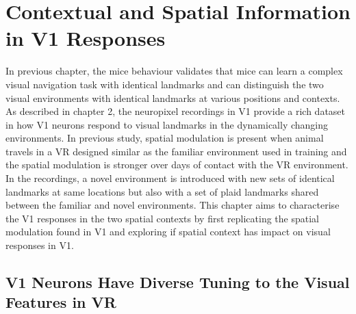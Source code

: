 \chapter{Contextual and Spatial Information in V1 Responses}
\label{chapterlabel4}
In previous chapter, the mice behaviour validates that mice can learn a complex visual navigation task with identical landmarks and can distinguish the two visual environments with identical landmarks at various positions and contexts. As described in chapter 2, the neuropixel recordings in V1 provide a rich dataset in how V1 neurons respond to visual landmarks in the dynamically changing environments. In previous study, spatial modulation is present when animal travels in a VR designed similar as the familiar environment used in training and the spatial modulation is stronger over days of contact with the VR environment. In the recordings, a novel environment is introduced with new sets of identical landmarks at same locations but also with a set of plaid landmarks shared between the familiar and novel environments. This chapter aims to characterise the V1 responses in the two spatial contexts by first replicating the spatial modulation found in V1 and exploring if spatial context has impact on visual responses in V1.



\section{V1 Neurons Have Diverse Tuning to the Visual Features in VR}

